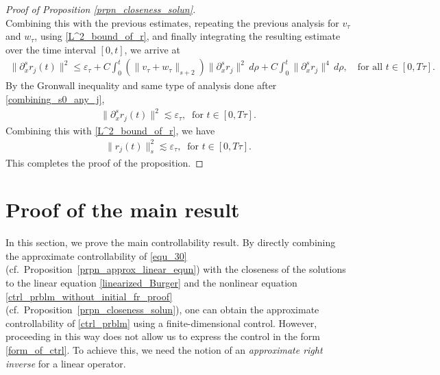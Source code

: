 \documentclass[10pt, reqno]{amsart}
\numberwithin{equation}{section}
\begin{document}
\begin{proof}[Proof of Proposition \ref{prpn_closeness_solun}]
\[\]  
Combining this with the previous estimates,  repeating the previous analysis for $v_{\tau}$ and $w_{\tau}$, using \eqref{L^2_bound_of_r}, and finally integrating the resulting estimate over the time interval $[0,t]$, we arrive at
\begin{align*}
	\| \partial_x^s r_j(t) \|^2 \le \varepsilon_{\tau} + C \int_{0}^{t}  (\| v_{\tau} + w_{\tau} \|_{s + 2}) \|\partial_x^s r_j\|^2 \, d\rho + C \int_0^t \|\partial_x^s r_j \|^4 \, d\rho, \quad \text{for all } t \in [0, T\tau].
\end{align*}
By the Gronwall inequality and same type of analysis done after \eqref{combining_s0_any_j}, 
\begin{align*}
\| \partial_x^s r_j (t)  \|^2 \lesssim \varepsilon_{\tau}, \ \text{ for } t \in [0, T\tau].
\end{align*}
Combining this with \eqref{L^2_bound_of_r}, we have
\begin{align}\label{H^s_bdd_r_for_s_ge3_any_j}
	\|r_j(t)\|_s^2 \lesssim \varepsilon_{\tau}, \ \text{ for } t \in [0, T\tau].
\end{align}
This completes the proof of the proposition.
\end{proof}



\section{Proof of the main result}
\label{section-aaprox_control}
In this section, we prove the main controllability result. By directly combining the approximate controllability of \eqref{equ_30} (cf.~Proposition~\ref{prpn_approx_linear_equn}) with the closeness of the solutions to the linear equation \eqref{linearized_Burger} and the nonlinear equation \eqref{ctrl_prblm_without_initial_fr_proof} (cf.~Proposition~\ref{prpn_closeness_solun}), one can obtain the approximate controllability of \eqref{ctrl_prblm} using a finite-dimensional control. However, proceeding in this way does not allow us to express the control in the form \eqref{form_of_ctrl}. To achieve this, we need the notion of an \textit{approximate right inverse} for a linear operator.
\end{document}
